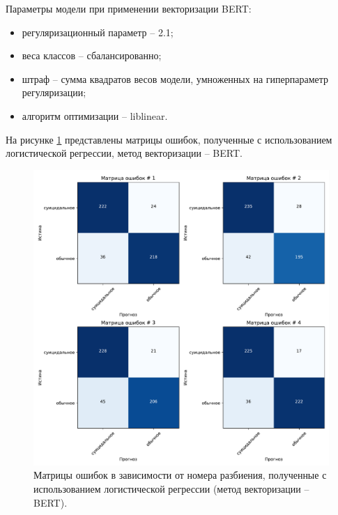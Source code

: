 Параметры модели при применении векторизации BERT:
\begin{itemize}
	\item регуляризационный параметр -- 2.1;
	\item веса классов -- сбалансированно;
	\item штраф -- сумма квадратов весов модели, умноженных на гиперпараметр регуляризации;
	\item алгоритм оптимизации -- liblinear.
\end{itemize}
На рисунке \ref{img:logicMatrBert} представлены матрицы ошибок, полученные с использованием логистической регрессии, метод векторизации -- BERT.

\begin{figure}[H]
	\centering
	\includegraphics[width=\textwidth]{inc/plots/logicMatrBert.pdf}
	\caption{ Матрицы ошибок в зависимости от номера разбиения, полученные с использованием логистической регрессии (метод векторизации -- BERT). }
	\label{img:logicMatrBert}
\end{figure}

